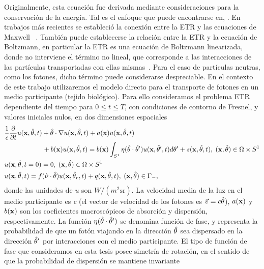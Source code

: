 Originalmente, esta ecuación fue derivada mediante 
consideraciones para la conservación de la energía. Tal es el enfoque 
que puede encontrarse en, \eg\cite{Chandrasekhar1960,Lewis1984}. En trabajos 
más recientes se estableció la conexión entre la ETR y las ecuaciones de Maxwell
~\cite{Mishchenko1999, Prasher2003}. También puede establecerse 
la relación entre la ETR y la ecuación de Boltzmann, 
en particular la ETR es una ecuación de Boltzmann linearizada, 
donde no interviene el término no lineal, que corresponde a las 
interacciones de las partículas transportadas con ellas mismas~\cite[Cap. 4]{Cercignani1988}. 
Para el caso de partículas neutras, como los fotones, dicho término puede considerarse despreciable. 
En el contexto de este trabajo utilizaremos el modelo directo para el transporte 
de fotones en un medio participante (\eg tejido biológico). Para ello consideramos el problema ETR dependiente 
del tiempo para $0\leq t\leq T$, con condiciones de contorno de Fresnel, y valores iniciales nulos, 
en dos dimensiones espaciales 
\begin{equation}
\begin{split}
\begin{aligned}
&\frac{1}{c}\frac{\partial }{\partial t}u(\mathbf{x},\hat{\theta},t) + \hat{\theta} \cdot \nabla u(\mathbf{x},\hat{\theta},t)+a(\mathbf{x})u(\mathbf{x},\hat{\theta},t)  \\
&\quad \quad \quad  \quad \quad \; \;\,  +b(\mathbf{x})u(\mathbf{x},\hat{\theta},t) = b(\mathbf{x})\int_{S^1}\eta(\hat{\theta}\cdot\hat{\theta} ') 
u(\mathbf{x},\hat \theta',t) d\theta'+ s(\mathbf{x},\hat{\theta},t),\;  (\mathbf{x},\hat{\theta})  \in \Omega\times S^1\\
&u(\mathbf{x},\hat{\theta},t=0)=0, \;  (\mathbf{x},\hat{\theta})  \in \Omega\times S^1\\
&u(\mathbf{x},\hat{\theta},t)=f(\hat{\nu} \cdot \hat{\theta}) u(\mathbf{x},\hat{\theta}_r,t) + q(\mathbf{x},\hat{\theta},t) , \; (\mathbf{x},\hat{\theta}) \in \Gamma_-,
\end{aligned}
\end{split}
\label{eq:RTE}
\end{equation}
donde las unidades de $u$ son $ W / (m ^ 2  \mathrm{sr}) $.
La velocidad media de la luz en el medio participante es \textit{c} 
(el vector de velocidad de los fotones es $ \vec {v} = c \hat{\theta} $), $a(\mathbf{x})$ y $b(\mathbf{x})$ son los 
coeficientes macroscópicos de absorción y dispersión, respectivamente. La función $\eta(\hat{\theta}\cdot\hat{\theta} ')$
se denomina función de fase, y representa la probabilidad de que un fotón 
viajando en la dirección $\hat{\theta}$ sea dispersado en la dirección $\hat{\theta}'$ 
por interacciones con el medio participante. El tipo de función 
de fase que consideramos en esta tesis posee simetría de rotación, 
en el sentido de que la probabilidad de dispersión se mantiene invariante 
